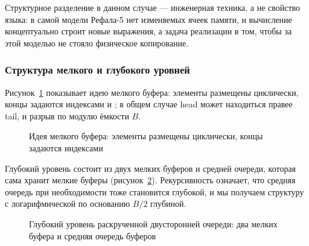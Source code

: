 Структурное разделение в данном случае --- инженерная техника, а не
свойство языка: в самой модели Рефала-5 нет изменяемых ячеек памяти, и
вычисление концептуально строит новые выражения, а задача реализации в
том, чтобы за этой моделью не стояло физическое копирование.

\subsubsection{Структура мелкого и глубокого уровней}

Рисунок~\ref{fig:shallow_ring} показывает идею мелкого буфера: элементы
размещены циклически, концы задаются индексами  и
; в общем случае head может находиться правее tail, и
разрыв  по модулю ёмкости \(B\).

\begin{figure}[!htb]
\centering
{}
\caption{Идея мелкого буфера: элементы размещены циклически, концы задаются индексами}
\label{fig:shallow_ring}
\end{figure}

Глубокий уровень состоит из двух мелких буферов и средней очереди, которая
сама хранит мелкие буферы (рисунок~\ref{fig:deep_deque}). Рекурсивность
означает, что средняя очередь при необходимости тоже становится глубокой,
и мы получаем структуру с логарифмической по основанию \(B/2\) глубиной.

\begin{figure}[!htb]
\centering
{}
\caption{Глубокий уровень раскрученной двусторонней очереди: два мелких буфера и средняя очередь буферов}
\label{fig:deep_deque}
\end{figure}

